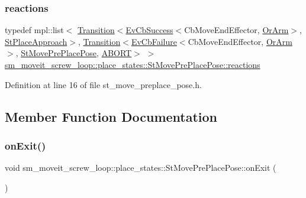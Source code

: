 \subsubsection{\texorpdfstring{reactions}{reactions}}
{\footnotesize\ttfamily typedef mpl\+::list$<$ \hyperlink{classsmacc_1_1Transition}{Transition}$<$\hyperlink{structsmacc_1_1EvCbSuccess}{Ev\+Cb\+Success}$<$Cb\+Move\+End\+Effector, \hyperlink{classsm__moveit__screw__loop_1_1OrArm}{Or\+Arm}$>$, \hyperlink{structsm__moveit__screw__loop_1_1place__states_1_1StPlaceApproach}{St\+Place\+Approach}$>$, \hyperlink{classsmacc_1_1Transition}{Transition}$<$\hyperlink{structsmacc_1_1EvCbFailure}{Ev\+Cb\+Failure}$<$Cb\+Move\+End\+Effector, \hyperlink{classsm__moveit__screw__loop_1_1OrArm}{Or\+Arm}$>$, \hyperlink{structsm__moveit__screw__loop_1_1place__states_1_1StMovePrePlacePose}{St\+Move\+Pre\+Place\+Pose}, \hyperlink{structsmacc_1_1default__transition__tags_1_1ABORT}{A\+B\+O\+RT}$>$ $>$ \hyperlink{structsm__moveit__screw__loop_1_1place__states_1_1StMovePrePlacePose_aae470612de9c72a9c2e48e166fd874a9}{sm\+\_\+moveit\+\_\+screw\+\_\+loop\+::place\+\_\+states\+::\+St\+Move\+Pre\+Place\+Pose\+::reactions}}



Definition at line 16 of file st\+\_\+move\+\_\+preplace\+\_\+pose.\+h.



\subsection{Member Function Documentation}
\mbox{\label{structsm__moveit__screw__loop_1_1place__states_1_1StMovePrePlacePose_a7d6cc9abb6954a44b4c79d70a84cd9cc}} 
\subsubsection{\texorpdfstring{on\+Exit()}{onExit()}}
{\footnotesize\ttfamily void sm\+\_\+moveit\+\_\+screw\+\_\+loop\+::place\+\_\+states\+::\+St\+Move\+Pre\+Place\+Pose\+::on\+Exit (\begin{DoxyParamCaption}{ }\end{DoxyParamCaption})\hspace{0.3cm}{\ttfamily [inline]}}



